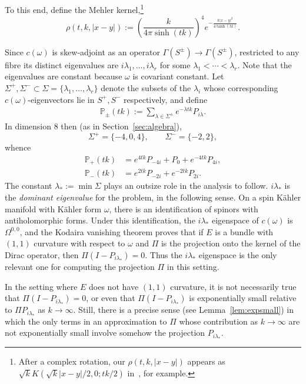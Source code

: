 \documentclass{article}
\newcommand{\proj}{\mathbb{P}}
\newcommand{\Spectrum}{\Sigma}
\theoremstyle{definition}
\theoremstyle{remark}
\begin{document}
To this end, define the Mehler kernel,\footnote{After a complex rotation, our $\rho(t,k, |x-y|)$ appears as $\sqrt{k} K(\sqrt{k}|x-y|/2, 0; tk/2)$ in~\cite[p. 183]{pauliWaveMechanics}, for example.}
\begin{equation}
    \label{eq:mehler}
    \rho(t,k,|x-y|) := \left( \frac{k}{4\pi \sinh(tk)} \right)^4 e^{-\frac{k|x-y|^2}{4\tanh(tk)}}.
\end{equation}

Since $c(\omega)$ is skew-adjoint as an operator $\Gamma(S^\pm) \to \Gamma(S^\pm)$, restricted to any fibre its distinct eigenvalues are $i \lambda_1, \ldots, i\lambda_r$ for some $\lambda_1 < \cdots < \lambda_r$.
Note that the eigenvalues are constant because $\omega$ is covariant constant.
Let $\Spectrum^+, \Spectrum^- \subset \Spectrum = \{\lambda_1,\ldots,\lambda_r\}$ denote the subsets of the $\lambda_i$ whose corresponding $c(\omega)$-eigenvectors lie in $S^+, S^-$ respectively, and define
\begin{align*}
    \proj_{\pm}(tk) := \sum_{\lambda \in \Spectrum^{\pm}} e^{-\lambda tk} P_{i\lambda}.
\end{align*}
In dimension 8 then (as in Section~\ref{sec:algebra}),
\[
    \Spectrum^+ = \{ -4, 0, 4\}, \qquad \Spectrum^- = \{ -2, 2 \},
\]
whence
\begin{align*}
    \proj_+(tk) &= e^{4tk} P_{-4i} + P_0 + e^{-4tk}P_{4i}, \\
    \proj_-(tk) &= e^{2tk} P_{-2i} + e^{-2tk} P_{2i}.
\end{align*}
The constant $\lambda_* := \min \Spectrum$ plays an outsize role in the analysis to follow. $i\lambda_*$ is the \emph{dominant eigenvalue} for the problem, in the following sense.
On a spin K\"ahler manifold with K\"ahler form $\omega$, there is an identification of spinors with antiholomorphic forms.
Under this identification, the $i\lambda_*$ eigenspace of $c(\omega)$ is $\Omega^{0,0}$, and the Kodaira vanishing theorem proves that if $E$ is a bundle with $(1,1)$ curvature with respect to $\omega$ and $\Pi$ is the projection onto the kernel of the Dirac operator, then $\Pi(I - P_{i\lambda_*}) = 0$.
Thus the $i\lambda_*$ eigenspace is the only relevant one for computing the projection $\Pi$ in this setting.

In the setting where $E$ does not have $(1,1)$ curvature, it is not necessarily true that $\Pi(I - P_{i\lambda_*}) = 0$, or even that $\Pi(I - P_{i\lambda_*})$ is exponentially small relative to $\Pi P_{i\lambda_*}$ as $k \to \infty$.
Still, there is a precise sense (see Lemma~\ref{lem:expsmall}) in which the only terms in an approximation to $\Pi$ whose contribution as $k \to \infty$ are not exponentially small involve somehow the projection $P_{i\lambda_*}$.
\end{document}
